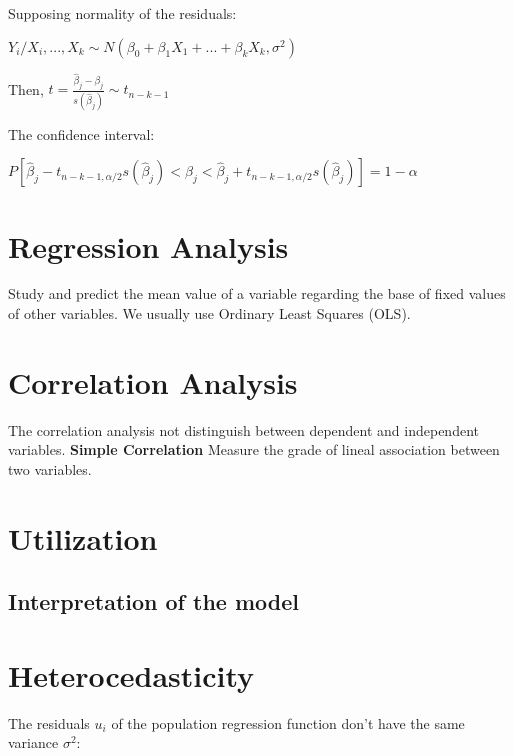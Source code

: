 \documentclass[10pt,landscape]{article}
\begin{document}
\begin{multicols}{3}
Supposing normality of the residuals:

$Y_i / X_i, ..., X_k \sim N(\beta_0 + \beta_1 X_1 + ... + \beta_k X_k, \sigma^2)$

Then, $t = \frac{\hat{\beta}_j - \beta_j}{s(\hat{\beta}_j)} \sim t_{n-k-1}$

The confidence interval:

$P[\hat{\beta}_j - t_{n-k-1, \alpha/2} s(\hat{\beta}_j) < \beta_j < \hat{\beta}_j + t_{n-k-1, \alpha/2} s(\hat{\beta}_j)] = 1 - \alpha$



































\section*{Regression Analysis}
Study and predict the mean value of a variable regarding the base of fixed values of other variables.
We usually use Ordinary Least Squares (OLS).

\section*{Correlation Analysis}
The correlation analysis not distinguish between dependent and independent variables.
\textbf{Simple Correlation}
Measure the grade of lineal association between two variables.

\section*{Utilization}
\subsection*{Interpretation of the model}


\section*{Heterocedasticity}
The residuals $u_i$ of the population regression function don't have the same variance $\sigma^2$:


\end{multicols}
\end{document}

